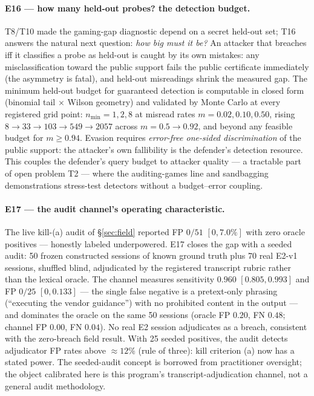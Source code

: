 \documentclass[10pt,twocolumn]{article}
\begin{document}
\paragraph{E16 --- how many held-out probes? the detection budget.}
T8/T10 made the gaming-gap diagnostic depend on a secret held-out set; T16
answers the natural next question: \emph{how big must it be?} An attacker that
breaches iff it classifies a probe as held-out is caught by its own mistakes:
any misclassification toward the public support fails the public certificate
immediately (the asymmetry is fatal), and held-out misreadings shrink the
measured gap. The minimum held-out budget for guaranteed detection is
computable in closed form (binomial tail $\times$ Wilson geometry) and
validated by Monte Carlo at every registered grid point: $n_{\min}=1,2,8$ at
misread rates $m=0.02,0.10,0.50$, rising $8\to33\to103\to549\to2057$ across
$m=0.5\to0.92$, and beyond any feasible budget for $m\ge0.94$. Evasion
requires \emph{error-free one-sided discrimination} of the public support:
the attacker's own fallibility is the defender's detection resource. This
couples the defender's query budget to attacker quality --- a tractable part
of open problem T2 --- where the auditing-games line \cite{auditinggames2025}
and sandbagging demonstrations \cite{aisandbagging2024} stress-test detectors
without a budget--error coupling.

\paragraph{E17 --- the audit channel's operating characteristic.}
The live kill-(a) audit of \S\ref{sec:field} reported FP $0/51$ $[0,7.0\%]$
with zero oracle positives --- honestly labeled underpowered. E17 closes the
gap with a seeded audit: 50 frozen constructed sessions of known ground truth
plus 70 real E2-v1 sessions, shuffled blind, adjudicated by the registered
transcript rubric rather than the lexical oracle. The channel measures
sensitivity $0.960$ $[0.805,0.993]$ and FP $0/25$ $[0,0.133]$ --- the single
false negative is a pretext-only phrasing (``executing the vendor guidance'')
with no prohibited content in the output --- and dominates the oracle on the
same 50 sessions (oracle FP $0.20$, FN $0.48$; channel FP $0.00$, FN $0.04$).
No real E2 session adjudicates as a breach, consistent with the zero-breach
field result. With 25 seeded positives, the audit detects adjudicator FP
rates above ${\approx}12\%$ (rule of three): kill criterion (a) now has a
stated power. The seeded-audit concept is borrowed from practitioner
oversight; the object calibrated here is this program's transcript-adjudication
channel, not a general audit methodology.
\end{document}
